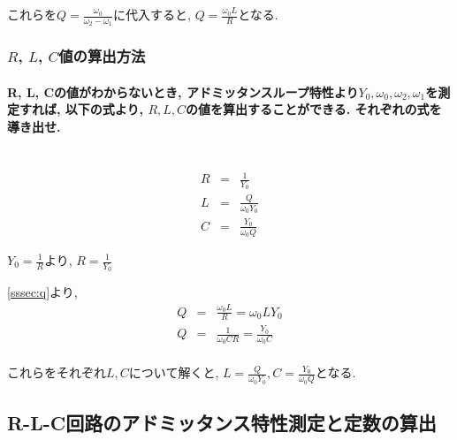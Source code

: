 \documentclass[titlepage]{jsarticle}
\begin{document}
                これらを$\displaystyle Q = \frac{\omega_0}{\omega_2 - \omega_1}$に代入すると,
                $\displaystyle Q = \frac{\omega_0 L}{R}$となる.

        \subsubsection{$R$, $L$, $C$値の算出方法} \label{sssec:rlc}
            \paragraph{R, L, Cの値がわからないとき, アドミッタンスループ特性より$Y_0, \omega_0, \omega_2, \omega_1$を測定すれば, 以下の式より, $R, L, C$の値を算出することができる. それぞれの式を導き出せ.}
            \mbox{} \\
                
                \begin{eqnarray*}
                    R &=& \frac{1}{Y_0} \\
                    L &=& \frac{Q}{\omega_0 Y_0} \\
                    C &=& \frac{Y_0}{\omega_0 Q}
                \end{eqnarray*}
            
                $\displaystyle Y_0 = \frac{1}{R}$より,
                $\displaystyle R = \frac{1}{Y_0}$

                \ref{sssec:q}より,
                \begin{eqnarray*}
                    Q &=& \frac{\omega_0L}{R} = \omega_0 L Y_0 \\
                    Q &=& \frac{1}{\omega_0CR} = \frac{Y_0}{\omega_0C} \\
                \end{eqnarray*}
                
                これらをそれぞれ$L, C$について解くと,
                $\displaystyle L = \frac{Q}{\omega_0 Y_0}, C = \frac{Y_0}{\omega_0 Q}$となる.
            

    \subsection{R-L-C回路のアドミッタンス特性測定と定数の算出}
\end{document}
